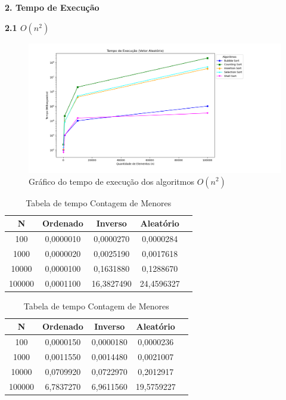 \documentclass[10pt]{article}
\begin{document}
\vspace{0.25cm}

\textbf{2. Tempo de Execução}

\vspace{0.5cm}

\textbf{2.1 $O(n^2)$}

\begin{figure}[H]
  \centering
  \includegraphics[width=1.1\textwidth]{TempoExecn2.png}
  \caption{Gráfico do tempo de execução dos algoritmos $O(n^2)$}
  \label{fig:1}
\end{figure}

\begin{table}[H]
  \parbox{.45\linewidth}{
    \centering
    \caption{Tabela de tempo BubbleSort}
    \begin{tabular}{|c|c|c|c|c|}
    \hline
    N & Ordenado & Inverso & Aleatório \\ \hline
    100 & 0,0000010 & 0,0000270 & 0,0000284 \\ \hline
    1000 & 0,0000020 & 0,0025190 & 0,0017618 \\ \hline
    10000 & 0,0000100 & 0,1631880 & 0,1288670 \\ \hline
    100000 & 0,0001100 & 16,3827490 & 24,4596327 \\ \hline
    \end{tabular}
  }
  \hfill
  \parbox{.45\linewidth}{
    \centering
    \caption{Tabela de tempo Contagem de Menores}
    \begin{tabular}{|c|c|c|c|c|}
    \hline
    N & Ordenado & Inverso & Aleatório \\ \hline
    100 & 0,0000150 & 0,0000180 & 0,0000236 \\ \hline
    1000 & 0,0011550 & 0,0014480 & 0,0021007 \\ \hline
    10000 & 0,0709920 & 0,0722970 & 0,2012917 \\ \hline
    100000 & 6,7837270 & 6,9611560 & 19,5759227 \\ \hline
    \end{tabular}
  }
\end{table}
\end{document}
